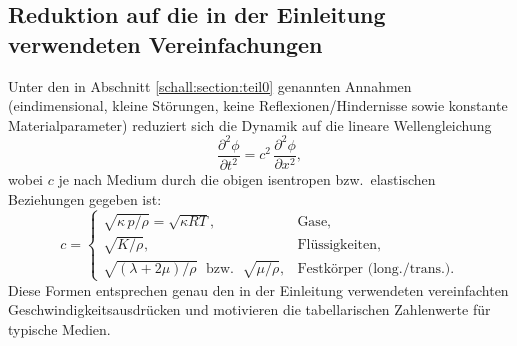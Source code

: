 \begin{comment}
Somit erhält man in isotropen Medien zwei Wellengeschwindigkeiten \cite{schall:landaulifschitz,schall:gurtin}:
\begin{align}
    \boxed{\,c_T=\sqrt{\frac{\mu}{\rho}}=\sqrt{\frac{G}{\rho}}\,} \quad &\text{(transversal, Scherwellen)},\\[2mm]
    \boxed{\,c_L=\sqrt{\frac{\lambda+2\mu}{\rho}}\,} \quad &\text{(longitudinal, Druckwellen)}.
\end{align}
In technischen Materialparametern, sprich Elastizitätsmodul $E$ und Poissonzahl $\nu$, mit
\[
    \mu=G=\frac{E}{2(1+\nu)},
    \qquad
    \lambda=\frac{E\,\nu}{(1+\nu)(1-2\nu)},
\]
ergeben sich die in der Einleitung verwendeten Ausdrücke
\begin{align}
    \boxed{\,c_{s,\mathrm{long}}
    = \sqrt{\frac{E(1-\nu)}{\rho(1+\nu)(1-2\nu)}}\,},\qquad
    \boxed{\,c_{s,\mathrm{trans}}
    = \sqrt{\frac{E}{2\rho(1+\nu)}}=\sqrt{\frac{G}{\rho}}\,}.
\end{align}
Typisch ist $c_L>c_T$, und beide liegen deutlich über Gas- und Flüssigkeitswerten (z.\,B. Stahl $c\approx 5{,}0\text{--}5{,}9\,\mathrm{km/s}$ für Longitudinalwellen, je nach Legierung).

\end{comment}

\subsection{Reduktion auf die in der Einleitung verwendeten Vereinfachungen}
Unter den in Abschnitt \ref{schall:section:teil0} genannten Annahmen (eindimensional,
kleine Störungen, keine Reflexionen/Hindernisse sowie konstante
Materialparameter) reduziert sich die Dynamik auf die lineare
Wellengleichung
\[
    \frac{\partial^2 \phi}{\partial t^2}=c^2\,\frac{\partial^2 \phi}{\partial x^2},
\]
wobei $c$ je nach Medium durch die obigen isentropen bzw.\ elastischen
Beziehungen gegeben ist:
\[
    c=\begin{cases}
    \sqrt{\kappa\,p/\rho}=\sqrt{\kappa R T}, & \text{Gase},\\[1mm]
    \sqrt{K/\rho}, & \text{Flüssigkeiten},\\[1mm]
    \sqrt{(\lambda+2\mu)/\rho}\;\text{ bzw. }\;\sqrt{\mu/\rho}, & \text{Festkörper (long./trans.)}.
\end{cases}
\]
Diese Formen entsprechen genau den in der Einleitung verwendeten
vereinfachten Geschwindigkeitsausdrücken und motivieren die
tabellarischen Zahlenwerte für typische Medien.
